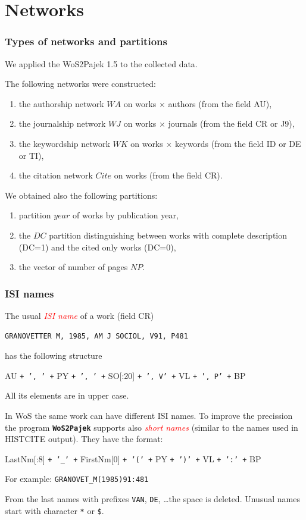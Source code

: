 \documentclass[hyperref={pdfstartview={FitBH -32768},
                         pdfpagemode=FullScreen,
                         plainpages=false,
                         colorlinks=true}
              ]{beamer}
\newcommand{\WoSPajek}{\texttt{\textbf{WoS2Pajek}}\xspace}
\newcommand{\keyw}[1]{\textcolor{red}{\emph{#1}}}
\begin{document}
\section{Networks}


\begin{frame}[fragile]
\frametitle{Types of networks and partitions}
\small
We applied the WoS2Pajek 1.5  to the collected data.\medskip

The following networks were constructed: 
\begin{enumerate}
\item the authorship network $WA$ on works $\times$ authors  (from the field AU), 
\item the journalship network $WJ$ on  works $\times$ journals  (from the field CR or J9), 
\item the keywordship network $WK$ on works  $\times$ keywords (from the field ID or DE or TI), 
\item the citation network $Cite$ on works (from the field CR).
\end{enumerate}

We obtained also the following partitions: 
\begin{enumerate}
\item partition $year$ of works by publication year, 
\item the $DC$ partition distinguishing between works with complete description (DC=1) and the cited only works (DC=0),
\item the vector of number of pages $NP$.
\end{enumerate}
\end{frame}

\begin{frame}[fragile]
\frametitle{ISI names}
\footnotesize
The usual \keyw{ISI name} of a work (field CR)
\begin{verbatim}
GRANOVETTER M, 1985, AM J SOCIOL, V91, P481
\end{verbatim}
has the following structure\medskip

   AU \texttt{+ ', ' +} PY \texttt{+ ', ' +} SO[:20] \texttt{+ ', V' +} VL  \texttt{+ ', P' +} BP\medskip

\noindent All its elements are in upper case.

In WoS the same work can have different ISI names. To improve
the precission the program \WoSPajek supports also
\keyw{short names} (similar to the names used in HISTCITE output).
They have the format:\medskip

   LastNm[:8] \texttt{+ '\_' +} FirstNm[0] \texttt{+ '(' +} PY
   \texttt{+ ')' +} VL \texttt{+ ':' +} BP\medskip

For example: \quad
\texttt{GRANOVET\_M(1985)91:481}

From the last names with prefixes \texttt{VAN}, \texttt{DE}, \ldots the space is deleted.
Unusual names start with character \texttt{*} or \texttt{\$}.

\end{frame}
\end{document}
